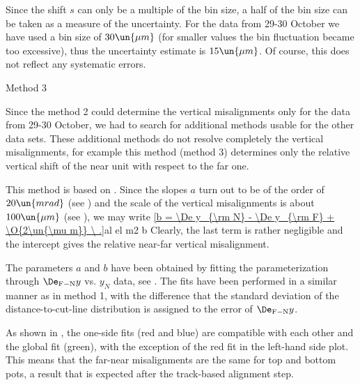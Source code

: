 Since the shift $s$ can only be a multiple of the bin size, a half of the bin size can be taken as a measure of the uncertainty. For the data from 29-30 October we have used a bin size of $30\un{\mu m}$ (for smaller values the bin fluctuation became too excessive), thus the uncertainty estimate is $15\un{\mu m}$. Of course, this does not reflect any systematic errors. 



\caption{Method 3}

Since the method 2 could determine the vertical misalignments only for the data from 29-30 October, we had to search for additional methods usable for the other data sets. These additional methods do not resolve completely the vertical misalignments, for example this method (method 3) determines only the relative vertical shift of the near unit with respect to the far one.

This method is based on . Since the slopes $a$ turn out to be of the order of $20\un{mrad}$ (see ) and the scale of the vertical misalignments is about $100\un{\mu m}$ (see ), we may write
\eqref{b = \De y_{\rm N} - \De y_{\rm F} + \O{2\un{\mu m}} \ .}{al el m2 b}
Clearly, the last term is rather negligible and the intercept gives the relative near-far vertical misalignment.

The parameters $a$ and $b$ have been obtained by fitting the parameterization  through $\De_{\rm F-N} y$ vs. $y_{N}$ data, see . The fits have been performed in a similar manner as in method 1, with the difference that the standard deviation of the distance-to-cut-line distribution is assigned to the error of $\De_{\rm F-N} y$.

As shown in , the one-side fits (red and blue) are compatible with each other and the global fit (green), with the exception of the red fit in the left-hand side plot. This means that the far-near misalignments are the same for top and bottom pots, a result that is expected after the track-based alignment step.



